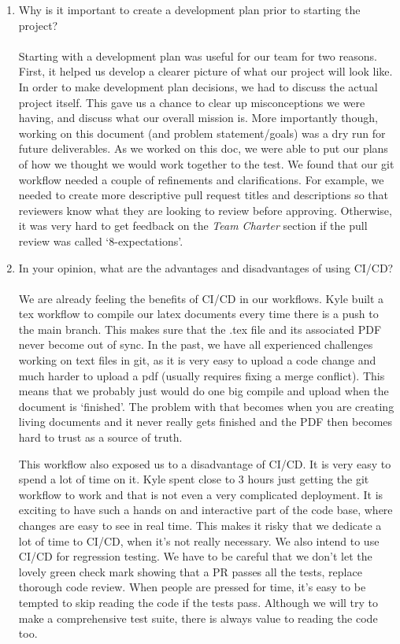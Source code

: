 \documentclass{article}
\begin{document}
\begin{enumerate}
    \item Why is it important to create a development plan prior to starting the
    project?\\\\
    Starting with a development plan was useful for our team for two reasons. First, it helped us develop a clearer picture of what our project will look
    like. In order to make development plan decisions, we had to discuss the actual project itself. This gave us a chance to clear up misconceptions
    we were having, and discuss what our overall mission is. More importantly though, working on this document (and problem statement/goals)
    was a dry run for future deliverables. As we worked on this doc, we were able to put our plans of how we thought we would work together to the test. We found 
    that our git workflow needed a couple of refinements and clarifications. For example, we needed to create more descriptive pull request titles and descriptions
    so that reviewers know what they are looking to review before approving. Otherwise, it was very hard to get feedback on the \textit{Team Charter} section if the 
    pull review was called `8-expectations'.
  
    \item In your opinion, what are the advantages and disadvantages of using
    CI/CD?\\\\
    We are already feeling the benefits of CI/CD in our workflows. Kyle built a tex workflow to compile our latex documents every time there is a push to the
    main branch. This makes sure that the .tex file and its associated PDF never become out of sync. In the past, we have all experienced challenges working on
    text files in git, as it is very easy to upload a code change and much harder to upload a pdf (usually requires fixing a merge conflict). This means that
    we probably just would do one big compile and upload when the document is `finished'. The problem with that becomes when you are creating living documents
    and it never really gets finished and the PDF then becomes hard to trust as a source of truth.

    This workflow also exposed us to a disadvantage of CI/CD. It is very easy to spend a lot of time on it. Kyle spent close to 3 hours just getting the git workflow to work
    and that is not even a very complicated deployment. It is exciting to have such a hands on and interactive part of the code base, where changes are easy
    to see in real time. This makes it risky that we dedicate a lot of time to CI/CD, when it's not really necessary. We also intend to use CI/CD for regression testing.
    We have to be careful that we don't let the lovely green check mark showing that a PR passes all the tests, replace thorough code review. When people are pressed for time, it's
    easy to be tempted to skip reading the code if the tests pass. Although we will try to make a comprehensive test suite, there is always value to reading the code too.


\end{enumerate}
\end{document}
